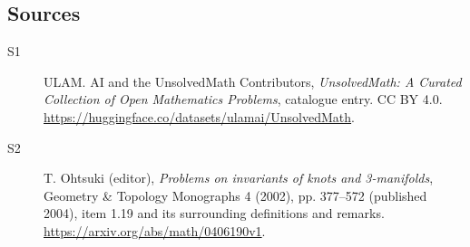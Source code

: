 \documentclass[11pt]{article}
\begin{document}
\subsection{Sources}
\begin{description}
\item[\hypertarget{source:statement:1}{S1}] ULAM. AI and the UnsolvedMath Contributors, \emph{UnsolvedMath: A Curated Collection of Open Mathematics Problems}, catalogue entry. CC BY 4.0. \url{https://huggingface.co/datasets/ulamai/UnsolvedMath}.
\item[\hypertarget{source:statement:2}{S2}] T. Ohtsuki (editor), \emph{Problems on invariants of knots and 3-manifolds}, Geometry \& Topology Monographs 4 (2002), pp. 377--572 (published 2004), item 1.19 and its surrounding definitions and remarks. \url{https://arxiv.org/abs/math/0406190v1}.
\end{description}
\label{end:statement}
\end{document}
